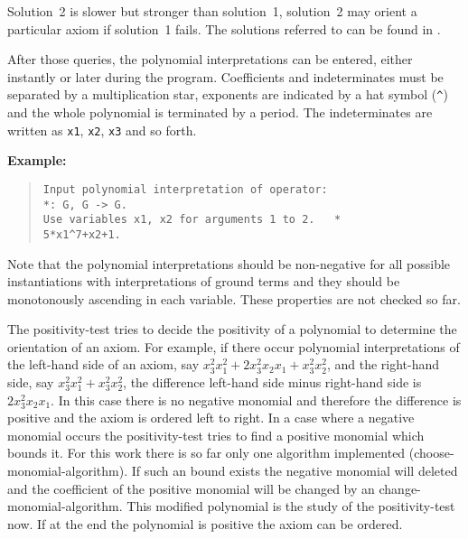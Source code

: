 Solution~2 is slower but stronger than solution~1,
solution~2 may orient a particular axiom if solution~1 fails.
The solutions referred to can be found in \cite{BenCherifaLescanne:87}.

After those queries, the polynomial interpretations can be entered,
either instantly or later during the program.
Coefficients and indeterminates must be separated by a multiplication star,
exponents are indicated by a hat symbol (\verb!^!) and the whole polynomial
is terminated by a period. The indeterminates are written as {\tt x1},
{\tt x2}, {\tt x3} and so forth.

\noindent
{\bf Example:}

\begin{quote}
\begin{verbatim}
Input polynomial interpretation of operator:
*: G, G -> G.
Use variables x1, x2 for arguments 1 to 2.   *
5*x1^7+x2+1.
\end{verbatim}
\end{quote}

Note that the polynomial interpretations should be non-negative for all
possible instantiations with interpretations of ground terms and they
should be monotonously ascending in each variable. These properties are
not checked so far.

The positivity-test tries to decide the positivity of a polynomial to
determine the orientation of an axiom. For example, if there occur
polynomial interpretations of the left-hand side of an axiom, say
\(x_3^2x_1^2+2x_3^2x_2x_1+x_3^2x_2^2\), and the right-hand side, say
\(x_3^2x_1^2+x_3^2x_2^2\), the difference left-hand side minus right-hand side
is \(2x_3^2x_2x_1\). In this case there is no negative monomial and therefore
the difference is positive and the axiom is ordered left to right. In a
case where a negative monomial occurs the positivity-test tries to
find a positive monomial which bounds it. For this work there is so
far only one algorithm implemented (choose-monomial-algorithm).
If such an bound exists the negative monomial will deleted and the
coefficient of the positive monomial will be changed by an
change-monomial-algorithm. This modified polynomial is the study of
the positivity-test now. If at the end the polynomial is positive the
axiom can be ordered.
